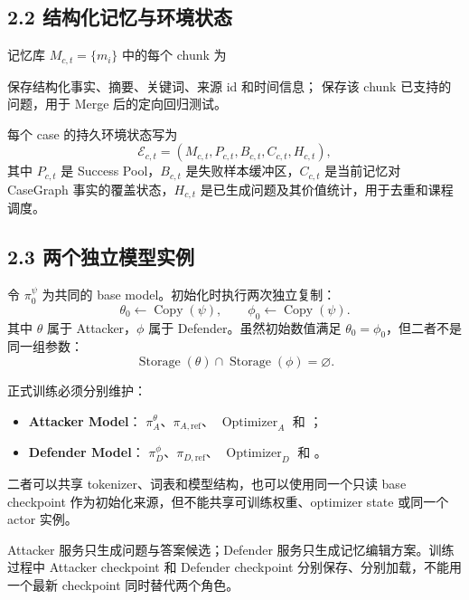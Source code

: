 \documentclass[a4paper,11pt]{article}
\begin{document}
\subsection*{2.2 结构化记忆与环境状态}

记忆库 $M_{c,t}=\{m_i\}$ 中的每个 chunk 为
\begin{implbox}

 保存结构化事实、摘要、关键词、来源 id 和时间信息；
 保存该 chunk 已支持的问题，用于 Merge 后的定向回归测试。
\end{implbox}

每个 case 的持久环境状态写为
\[
    \mathcal{E}_{c,t}
    =(M_{c,t},P_{c,t},B_{c,t},C_{c,t},H_{c,t}),
\]
其中 $P_{c,t}$ 是 Success Pool，$B_{c,t}$ 是失败样本缓冲区，$C_{c,t}$ 是当前记忆对 CaseGraph 事实的覆盖状态，$H_{c,t}$ 是已生成问题及其价值统计，用于去重和课程调度。

\subsection*{2.3 两个独立模型实例}

令 $\pi_0^{\psi}$ 为共同的 base model。初始化时执行两次独立复制：
\[
    \theta_0\leftarrow\operatorname{Copy}(\psi),
    \qquad
    \phi_0\leftarrow\operatorname{Copy}(\psi).
\]
其中 $\theta$ 属于 Attacker，$\phi$ 属于 Defender。虽然初始数值满足
$\theta_0=\phi_0$，但二者不是同一组参数：
\[
    \operatorname{Storage}(\theta)
    \cap
    \operatorname{Storage}(\phi)
    =\varnothing.
\]

正式训练必须分别维护：
\begin{implbox}
\begin{itemize}
    \item \textbf{Attacker Model}：
    $\pi_A^{\theta}$、$\pi_{A,\mathrm{ref}}$、
    $\operatorname{Optimizer}_A$ 和 ；
    \item \textbf{Defender Model}：
    $\pi_D^{\phi}$、$\pi_{D,\mathrm{ref}}$、
    $\operatorname{Optimizer}_D$ 和 。
\end{itemize}
二者可以共享 tokenizer、词表和模型结构，也可以使用同一个只读 base checkpoint
作为初始化来源，但不能共享可训练权重、optimizer state 或同一个 actor 实例。
\end{implbox}

Attacker 服务只生成问题与答案候选；Defender 服务只生成记忆编辑方案。训练过程中
Attacker checkpoint 和 Defender checkpoint 分别保存、分别加载，不能用一个最新
checkpoint 同时替代两个角色。
\end{document}
